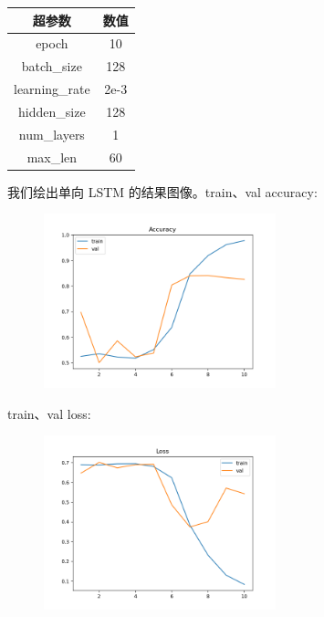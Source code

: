 \documentclass{article}
\begin{document}
\begin{table}[H]  
    \centering        
    \begin{tabular}{|c|c|}
    \hline
    {\bf 超参数} & {\bf 数值} \\
    \hline
    epoch & 10  \\
    \hline
    batch\_size & 128  \\
    \hline
    learning\_rate & 2e-3  \\
    \hline
    hidden\_size & 128 \\
    \hline
    num\_layers & 1 \\
    \hline
    max\_len & 60 \\
    \hline
    \end{tabular}
\end{table}

我们绘出单向 LSTM 的结果图像。train、val accuracy:
\begin{figure}[h]
    \centering
    \includegraphics[width=0.6\textwidth]{../results/lstm_acc.png}
\end{figure}

\FloatBarrier

train、val loss:
\begin{figure}[h]
    \centering
    \includegraphics[width=0.6\textwidth]{../results/lstm_loss.png}
\end{figure}
\end{document}
